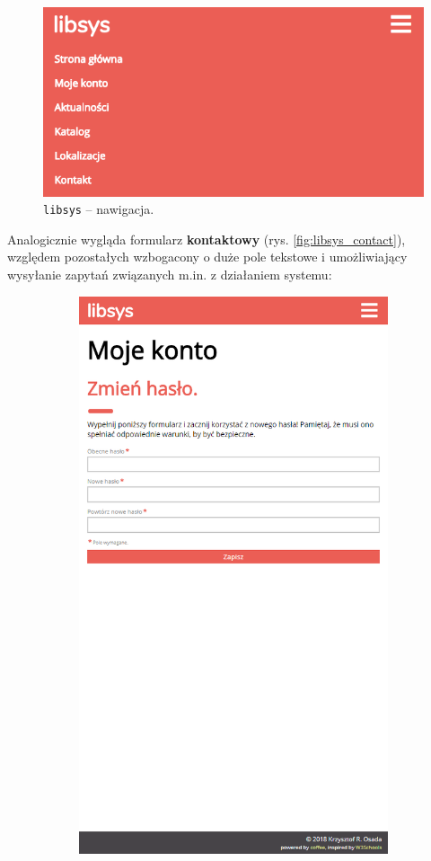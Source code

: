\documentclass[12pt, a4paper]{article}
\begin{document}
\begin{figure}[h]
    \centering
    \includegraphics[width=.4\textwidth]{img/libsys_menu.png}
    \caption{\texttt{libsys} -- nawigacja.}
\end{figure}

Analogicznie wygląda formularz \textbf{kontaktowy} (rys. \ref{fig:libsys_contact}), względem pozostałych wzbogacony o duże pole tekstowe i umożliwiający wysyłanie zapytań związanych m.in. z działaniem systemu:

\begin{figure}[h]
\centering
\begin{subfigure}{.4\textwidth}
    \centering
    \includegraphics[width=.75\linewidth]{img/libsys_account_3.png}

\end{subfigure}
\end{figure}
\end{document}
